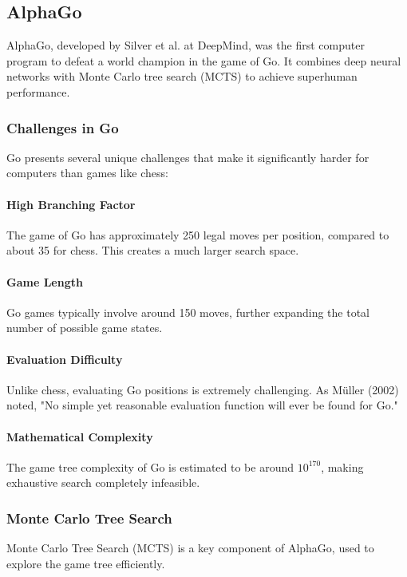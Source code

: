 \documentclass[11pt]{article}
\begin{document}
\subsection{AlphaGo}

AlphaGo, developed by Silver et al. at DeepMind, was the first computer program to defeat a world champion in the game of Go. It combines deep neural networks with Monte Carlo tree search (MCTS) to achieve superhuman performance.

\subsubsection{Challenges in Go}

Go presents several unique challenges that make it significantly harder for computers than games like chess:

\paragraph{High Branching Factor}
The game of Go has approximately 250 legal moves per position, compared to about 35 for chess. This creates a much larger search space.

\paragraph{Game Length}
Go games typically involve around 150 moves, further expanding the total number of possible game states.

\paragraph{Evaluation Difficulty}
Unlike chess, evaluating Go positions is extremely challenging. As Müller (2002) noted, "No simple yet reasonable evaluation function will ever be found for Go."

\paragraph{Mathematical Complexity}
The game tree complexity of Go is estimated to be around $10^{170}$, making exhaustive search completely infeasible.

\subsubsection{Monte Carlo Tree Search}

Monte Carlo Tree Search (MCTS) is a key component of AlphaGo, used to explore the game tree efficiently.
\end{document}
